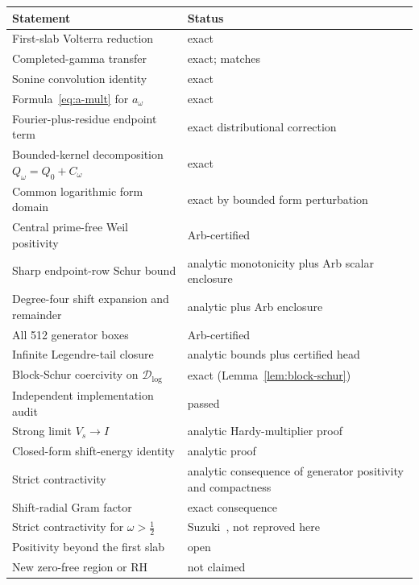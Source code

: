 \documentclass[11pt,a4paper]{article}
\newcommand{\Dlog}{\mathcal D_{\log}}
\theoremstyle{plain}
\theoremstyle{definition}
\numberwithin{equation}{section}
\begin{document}
\begin{center}
\small
\begin{tabular}{@{}p{}p{}@{}}
\toprule
Statement & Status\\
\midrule
First-slab Volterra reduction & exact\\
Completed-gamma transfer & exact; matches~\cite[Sect.~3.1]{Suzuki2012}\\
Sonine convolution identity & exact\\
Formula~\eqref{eq:a-mult} for $a_\omega$ & exact\\
Fourier-plus-residue endpoint term & exact distributional correction\\
Bounded-kernel decomposition $Q_\omega=Q_0+C_\omega$ & exact\\
Common logarithmic form domain & exact by bounded form perturbation\\
Central prime-free Weil positivity & Arb-certified\\
Sharp endpoint-row Schur bound & analytic monotonicity plus Arb scalar enclosure\\
Degree-four shift expansion and remainder & analytic plus Arb enclosure\\
All 512 generator boxes & Arb-certified\\
Infinite Legendre-tail closure & analytic bounds plus certified head\\
Block-Schur coercivity on $\Dlog$ & exact (Lemma~\ref{lem:block-schur})\\
Independent implementation audit & passed\\
Strong limit $V_s\to I$ & analytic Hardy-multiplier proof\\
Closed-form shift-energy identity & analytic proof\\
Strict contractivity & analytic consequence of generator positivity and compactness\\
Shift-radial Gram factor & exact consequence\\
Strict contractivity for $\omega>\tfrac12$ & Suzuki~\cite[Lemma~4.4]{Suzuki2012}, not reproved here\\
Positivity beyond the first slab & open\\
New zero-free region or RH & not claimed\\
\bottomrule
\end{tabular}
\end{center}
\end{document}
